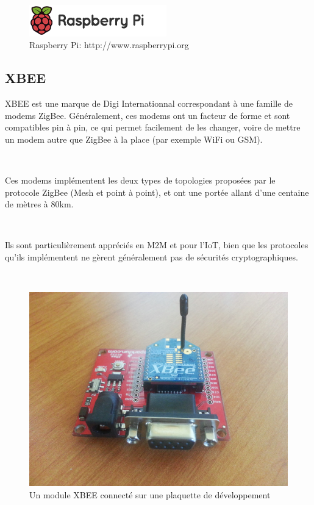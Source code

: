 \documentclass{article}
\begin{document}
~

\begin{figure}[h!]
    \centering\includegraphics[width=\linewidth*2/3]{img/sprite.png}
    \caption{Raspberry Pi: http://www.raspberrypi.org}
\end{figure}

\clearpage

\subsection{XBEE}
\label{xbee}

XBEE est une marque de Digi Internationnal correspondant à une famille de modems ZigBee. Généralement, ces modems ont un facteur de forme et sont compatibles pin à pin, ce qui permet facilement de les changer, voire de mettre un modem autre que ZigBee à la place (par exemple WiFi ou GSM).

~

Ces modems implémentent les deux types de topologies proposées par le protocole ZigBee (Mesh et point à point), et ont une portée allant d’une centaine de mètres à 80km.

~

Ils sont particulièrement appréciés en M2M et pour l’IoT, bien que les protocoles qu’ils implémentent ne gèrent généralement pas de sécurités cryptographiques.

~

\begin{figure}[h!]
    \centering\includegraphics[width=\linewidth*2/3]{img/xbee.jpg}
    \caption{Un module XBEE connecté sur une plaquette de développement}
\end{figure}
\end{document}
